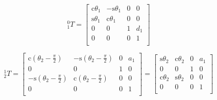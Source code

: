 \documentclass[twoside]{article}
\renewcommand{\c}{\text{c}}
\newcommand{\s}{\text{s}}
\newcommand{\pihalf}{\frac{\pi}{2}}
\newcommand{\T}[2]{\mbox{$_{#2}^{#1}{T}$}}
\begin{document}
\noindent
\begin{minipage}{0.33\linewidth}
\begin{equation}
\T{0}{1} =
  \begin{bmatrix}
    \c\theta_1 & -\s\theta_1 & 0 & 0 \\
    \s\theta_1 &  \c\theta_1 & 0 & 0 \\
            0 &          0 & 1 & d_1 \\
            0 &          0 & 0 & 1 \\
  \end{bmatrix}
\end{equation}
\end{minipage}%
\begin{minipage}{0.67\linewidth}
\begin{equation}
  \T{1}{2} =
  \begin{bmatrix}
  \c(\theta_2 - \pihalf) & -\s(\theta_2 - \pihalf) &  0 & a_1 \\
                       0 &                       0 &  1 &   0 \\
  -\s(\theta_2 - \pihalf)&  \c(\theta_2 - \pihalf) &  0 &   0 \\
                       0 &                       0 &  0 &   1 \\
  \end{bmatrix}
  =
  \begin{bmatrix}
  \s\theta_2 &  \c\theta_2 & 0 & a_1 \\
           0 &           0 & 1 &   0 \\
  \c\theta_2 &  \s\theta_2 & 0 &   0 \\
           0 &           0 & 0 &   1 \\
  \end{bmatrix}
\end{equation}
\end{minipage}

\vspace{0.5ex}
\end{document}
